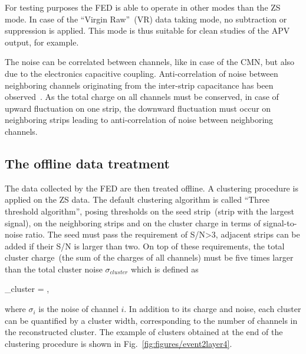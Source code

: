 For testing purposes the FED is able to operate in other modes than the ZS mode. In case of the ``Virgin Raw''~(VR) data taking mode, no subtraction or suppression is applied. This mode is thus suitable for clean studies of the APV output, for example.


The noise can be correlated between channels, like in case of the CMN, but also due to the electronics capacitive coupling. Anti-correlation of noise between neighboring channels originating from the inter-strip capacitance has been observed~\cite{Lutz:1987wd}. As the total charge on all channels must be conserved, in case of upward fluctuation on one strip, the downward fluctuation must occur on neighboring strips leading to anti-correlation of noise between neighboring channels.

\subsection{The offline data treatment}


The data collected by the FED are then treated offline. A clustering procedure is applied on the ZS data. The default clustering algorithm is called ``Three threshold algorithm'', posing thresholds on the seed strip~(strip with the largest signal), on the neighboring strips and on the cluster charge in terms of signal-to-noise ratio. The seed must pass the requirement of S/N>3, adjacent strips can be added if their S/N is larger than two. On top of these requirements, the total cluster charge~(the sum of the charges of all channels) must be five times larger than the total cluster noise $\sigma_{cluster}$ which is defined as


{
    \sigma_{cluster} = ,
}

where $\sigma_{i}$ is the noise of channel $i$. In addition to its charge and noise, each cluster can be quantified by a cluster width, corresponding to the number of channels in the reconstructed cluster. The example of clusters obtained at the end of the clustering procedure is shown in Fig.~\ref{fig:figures/event2layer4}.

